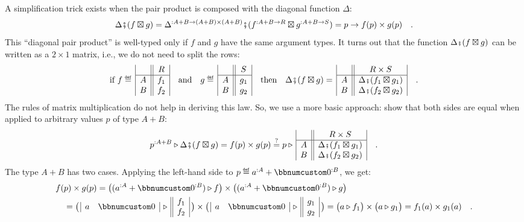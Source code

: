 A simplification trick exists when the pair product is composed with
the diagonal function $\Delta$:
\[
\Delta\bef(f\boxtimes g)=\Delta^{:A+B\rightarrow(A+B)\times(A+B)}\bef(f^{:A+B\rightarrow R}\boxtimes g^{:A+B\rightarrow S})=p\rightarrow f(p)\times g(p)\quad.
\]
This \textsf{``}diagonal pair product\textsf{''} is well-typed only if $f$ and $g$
have the same argument types. It turns out that the function $\Delta\bef(f\boxtimes g)$
can be written as a $2\times1$ matrix, i.e., we do not need to split
the rows:
\[
\text{if }f\triangleq\,\begin{array}{|c||c|}
 & R\\
\hline A & f_{1}\\
B & f_{2}
\end{array}\quad\text{and}\quad g\triangleq\,\begin{array}{|c||c|}
 & S\\
\hline A & g_{1}\\
B & g_{2}
\end{array}\quad\text{then}\quad\Delta\bef(f\boxtimes g)=\,\begin{array}{|c||c|}
 & R\times S\\
\hline A & \Delta\bef(f_{1}\boxtimes g_{1})\\
B & \Delta\bef(f_{2}\boxtimes g_{2})
\end{array}\quad.
\]
The rules of matrix multiplication do not help in deriving this law.
So, we use a more basic approach: show that both sides are equal when
applied to arbitrary values $p$ of type $A+B$:
\[
p^{:A+B}\triangleright\Delta\bef(f\boxtimes g)=f(p)\times g(p)\overset{?}{=}p\triangleright\,\begin{array}{|c||c|}
 & R\times S\\
\hline A & \Delta\bef(f_{1}\boxtimes g_{1})\\
B & \Delta\bef(f_{2}\boxtimes g_{2})
\end{array}\quad.
\]
The type $A+B$ has two cases. Applying the left-hand side to $p\triangleq a^{:A}+\bbnum 0^{:B}$,
we get:
\begin{align*}
 & f(p)\times g(p)=\big((a^{:A}+\bbnum 0^{:B})\triangleright f\big)\times\big((a^{:A}+\bbnum 0^{:B})\triangleright g\big)\\
 & \quad=\big(\,\begin{array}{|cc|}
a & \bbnum 0\end{array}\,\triangleright\,\begin{array}{||c|}
f_{1}\\
f_{2}
\end{array}\,\big)\times\big(\,\begin{array}{|cc|}
a & \bbnum 0\end{array}\,\triangleright\,\begin{array}{||c|}
g_{1}\\
g_{2}
\end{array}\,\big)=\big(a\triangleright f_{1}\big)\times\big(a\triangleright g_{1}\big)=f_{1}(a)\times g_{1}(a)\quad.
\end{align*}
